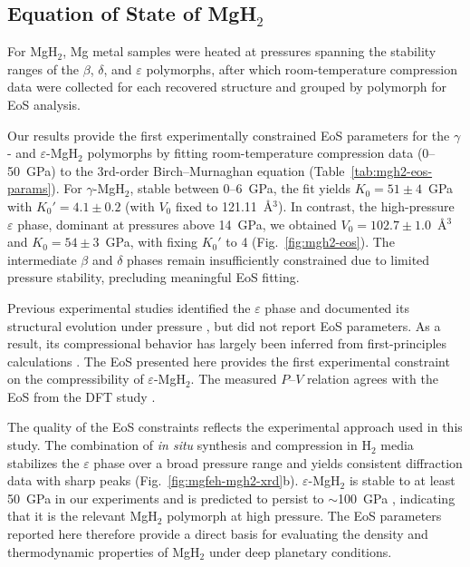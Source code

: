 \documentclass[draft,jgrga,12pt]{agujournal2019}
\begin{document}
\subsection{Equation of State of MgH$_2$}

For MgH$_2$, Mg metal samples were heated at pressures spanning the stability ranges of the $\beta$, $\delta$, and $\varepsilon$ polymorphs, after which room-temperature compression data were collected for each recovered structure and grouped by polymorph for EoS analysis.

Our results provide the first experimentally constrained EoS parameters for the $\gamma$- and $\varepsilon$-MgH$_2$ polymorphs by fitting room-temperature compression data (0--50~{GPa}) to the 3rd-order Birch–Murnaghan equation (Table~\ref{tab:mgh2-eos-params}). 
For $\gamma$-MgH$_2$, stable between 0--6~{GPa}, the fit yields $K_0=51{\pm}4$~GPa with $K_0'=4.1{\pm}0.2$ (with $V_0$ fixed to 121.11~Å$^3$). 
In contrast, the high-pressure $\varepsilon$ phase, dominant at pressures above 14~GPa, we obtained $V_0=102.7{\pm}1.0$~Å$^3$ and $K_0=54{\pm}3$~GPa, with fixing $K_0'$ to 4 (Fig.~\ref{fig:mgh2-eos}). 
The intermediate $\beta$ and $\delta$ phases remain insufficiently constrained due to limited pressure stability, precluding meaningful EoS fitting. 

Previous experimental studies identified the $\varepsilon$ phase and documented its structural evolution  under pressure \cite{moriwaki_structural_2006}, but did not report EoS parameters. 
As a result, its compressional behavior has largely been inferred from first-principles calculations \cite{cui_structural_2008}. 
The EoS presented here provides the first experimental constraint on the compressibility of $\varepsilon$-MgH$_2$. 
The measured $P$–$V$ relation agrees with the EoS from the DFT study \cite{cui_structural_2008}.

The quality of the EoS constraints reflects the experimental approach used in this study. 
The combination of \textit{in situ} synthesis and compression in H$_2$ media stabilizes the $\varepsilon$ phase over a broad pressure range and yields consistent diffraction data with sharp peaks (Fig.~\ref{fig:mgfeh-mgh2-xrd}b). 
$\varepsilon$-MgH$_2$ is stable to at least 50~{GPa} in our experiments and is predicted to persist to $\sim$100~{GPa} \cite{cui_structural_2008}, indicating that it is the relevant MgH$_2$ polymorph at high pressure. 
The EoS parameters reported here therefore provide a direct basis for evaluating the density and thermodynamic properties of MgH$_2$ under deep planetary conditions.
\end{document}

